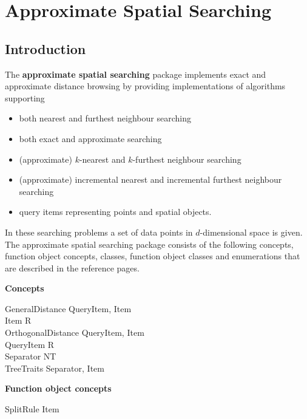 \chapter{Approximate Spatial Searching}

\section{Introduction}


The {\bf approximate spatial searching} package implements
exact and approximate distance browsing
by providing implementations of algorithms supporting

\begin{itemize} 

\item
both nearest and furthest neighbour searching

\item
both exact and approximate searching

\item 
(approximate) $k$-nearest and $k$-furthest neighbour searching

\item 
(approximate) incremental nearest and incremental furthest neighbour searching

\item
query items representing points and spatial objects.

\end{itemize}

In these searching problems a set of data points in $d$-dimensional
space is given.
The approximate spatial searching package 
consists of the following concepts, function object concepts, classes, function object classes
and enumerations that are described in the reference pages.

{\bf Concepts}

GeneralDistance \ccOpenAngle QueryItem, Item\ccCloseAngle \\
Item \ccOpenAngle R\ccCloseAngle \\ 
OrthogonalDistance \ccOpenAngle QueryItem, Item\ccCloseAngle \\
QueryItem \ccOpenAngle R\ccCloseAngle \\
Separator \ccOpenAngle NT\ccCloseAngle \\
TreeTraits \ccOpenAngle Separator, Item\ccCloseAngle 

{\bf Function object concepts}

SplitRule \ccOpenAngle Item\ccCloseAngle


